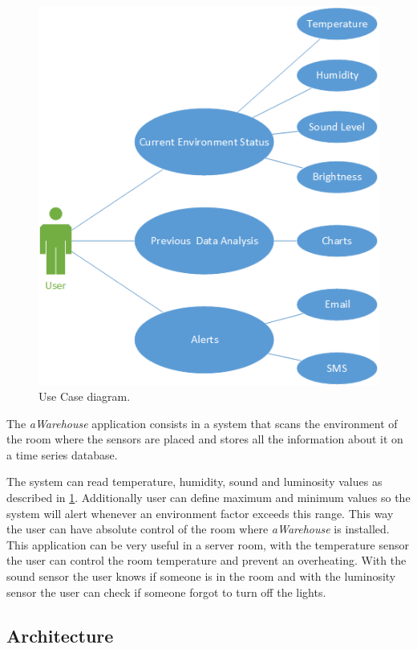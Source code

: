 \documentclass[12pt]{report}
\begin{document}
\begin{figure}
    \centering
    \includegraphics[scale=0.5]{use.png}
    \caption{Use Case diagram.}
    \label{fig:use}
\end{figure}

The \textit{aWarehouse} application consists in a system that scans the environment of the room where the sensors are placed and stores all the information about it on a time series database.

The system can read temperature, humidity, sound and luminosity values as described in \ref{fig:use}. Additionally user can define maximum and minimum values so the system will alert whenever an environment factor exceeds this range.
This way the user can have absolute control of the room where \textit{aWarehouse} is installed. This application can be very useful in a server room, with the temperature sensor the user can control the room temperature and prevent an overheating. With the sound sensor the user knows if someone is in the room and with the luminosity sensor the user can check if someone forgot to turn off the lights.



\subsection{Architecture}
\end{document}
